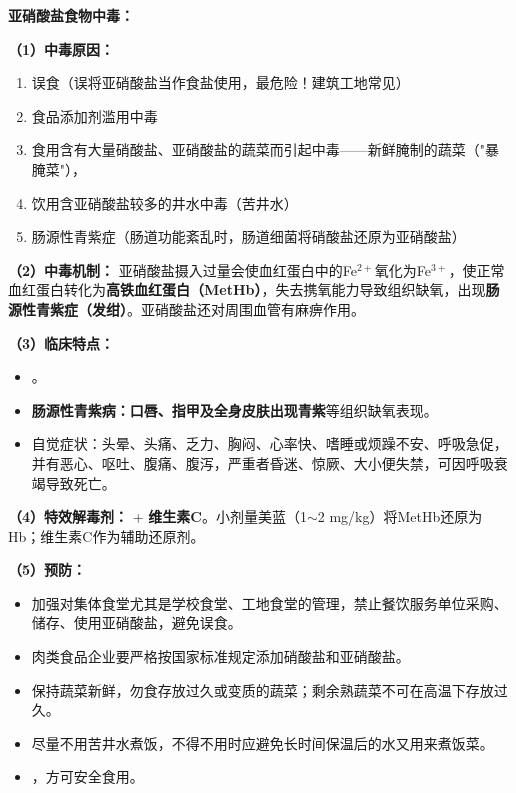 \begin{keybox}
\textbf{亚硝酸盐食物中毒：}

\textbf{（1）中毒原因：}
\begin{enumerate}[leftmargin=*]
    \item 误食（误将亚硝酸盐当作食盐使用，最危险！建筑工地常见）
    \item 食品添加剂滥用中毒
    \item 食用含有大量硝酸盐、亚硝酸盐的蔬菜而引起中毒——新鲜腌制的蔬菜（"暴腌菜"），
    \item 饮用含亚硝酸盐较多的井水中毒（苦井水）
    \item 肠源性青紫症（肠道功能紊乱时，肠道细菌将硝酸盐还原为亚硝酸盐）
\end{enumerate}

\textbf{（2）中毒机制：}\difficulty
亚硝酸盐摄入过量会使血红蛋白中的Fe$^{2+}$氧化为Fe$^{3+}$，使正常血红蛋白转化为\textbf{高铁血红蛋白（MetHb）}，失去携氧能力导致组织缺氧，出现\textbf{肠源性青紫症（发绀）}。亚硝酸盐还对周围血管有麻痹作用。

\textbf{（3）临床特点：}
\begin{itemize}[leftmargin=*]
    \item {}。
    \item \textbf{肠源性青紫病：}\textbf{口唇、指甲及全身皮肤出现青紫}等组织缺氧表现。
    \item 自觉症状：头晕、头痛、乏力、胸闷、心率快、嗜睡或烦躁不安、呼吸急促，并有恶心、呕吐、腹痛、腹泻，严重者昏迷、惊厥、大小便失禁，可因呼吸衰竭导致死亡。
\end{itemize}

\textbf{（4）特效解毒剂：} + \textbf{维生素C}。小剂量美蓝（1$\sim$2 mg/kg）将MetHb还原为Hb；维生素C作为辅助还原剂。

\textbf{（5）预防：}
\begin{itemize}[leftmargin=*]
    \item 加强对集体食堂尤其是学校食堂、工地食堂的管理，禁止餐饮服务单位采购、储存、使用亚硝酸盐，避免误食。
    \item 肉类食品企业要严格按国家标准规定添加硝酸盐和亚硝酸盐。
    \item 保持蔬菜新鲜，勿食存放过久或变质的蔬菜；剩余熟蔬菜不可在高温下存放过久。
    \item 尽量不用苦井水煮饭，不得不用时应避免长时间保温后的水又用来煮饭菜。
    \item {}，方可安全食用。
\end{itemize}
\end{keybox}

